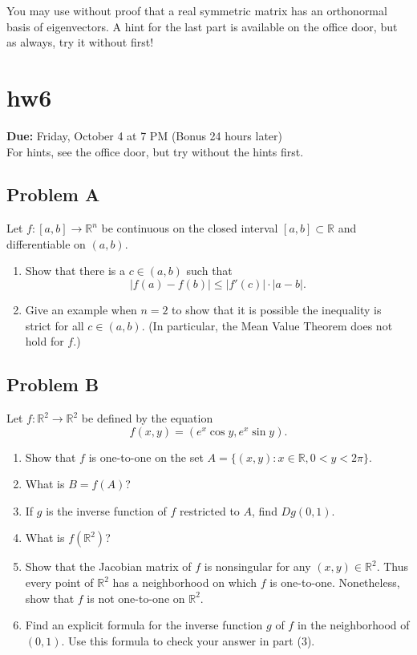 \documentclass[lang=en,11pt]{template}
\begin{document}
You may use without proof that a real symmetric matrix has an orthonormal basis of eigenvectors. A hint for the last part is available on the office door, but as always, try it without first!

\chapter{hw6}

\noindent
\textbf{Due:} Friday, October 4 at 7 PM (Bonus 24 hours later)\\
For hints, see the office door, but try without the hints first.

\section*{Problem A}
Let $f : [a, b] \to \mathbb{R}^n$ be continuous on the closed interval $[a, b] \subset \mathbb{R}$ and differentiable on $(a, b)$.
\begin{enumerate}
    \item Show that there is a $c \in (a, b)$ such that
    \[
    |f(a) - f(b)| \leq |f'(c)| \cdot |a - b|.
    \]
    \item Give an example when $n = 2$ to show that it is possible the inequality is strict for all $c \in (a, b)$. (In particular, the Mean Value Theorem does not hold for $f$.)
\end{enumerate}

\section*{Problem B}
Let $f : \mathbb{R}^2 \to \mathbb{R}^2$ be defined by the equation
\[
f(x, y) = (e^x \cos y, e^x \sin y).
\]
\begin{enumerate}
    \item Show that $f$ is one-to-one on the set $A = \{(x, y) : x \in \mathbb{R}, 0 < y < 2\pi\}$.
    \item What is $B = f(A)$?
    \item If $g$ is the inverse function of $f$ restricted to $A$, find $Dg(0, 1)$.
    \item What is $f(\mathbb{R}^2)$?
    \item Show that the Jacobian matrix of $f$ is nonsingular for any $(x, y) \in \mathbb{R}^2$. Thus every point of $\mathbb{R}^2$ has a neighborhood on which $f$ is one-to-one. Nonetheless, show that $f$ is not one-to-one on $\mathbb{R}^2$.
    \item Find an explicit formula for the inverse function $g$ of $f$ in the neighborhood of $(0, 1)$. Use this formula to check your answer in part (3).
\end{enumerate}
\end{document}
